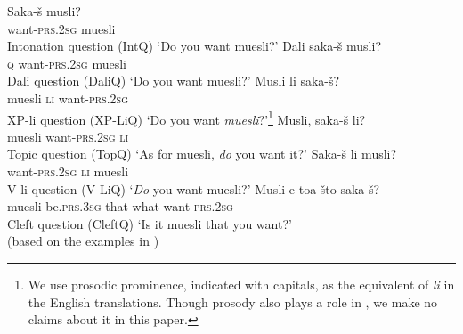 \documentclass[output=paper,
colorlinks,
citecolor=brown,
newtxmath
]{langscibook}
\begin{document}

\ea
    \ea \gll Saka-š musli? \\
want-\textsc{prs.2sg} muesli \\ \hfill Intonation question (IntQ)\label{intonation}
\glt  `Do you want muesli?' \label{intoq}
    \ex \gll Dali saka-š musli? \\
\textsc{q} want-\textsc{prs.2sg} muesli \\ \hfill Dali question (DaliQ)
\glt `Do you want muesli?'  \label{dali}
    \ex \gll Musli li saka-š? \\
muesli \textsc{li} want-\textsc{prs.2sg} \\ \hfill XP-li question (XP-LiQ)\label{li}
\glt `Do you want \emph{muesli}?'\footnote{We use prosodic prominence, indicated with capitals, as the equivalent of \textit{li} in the English translations. Though prosody also plays a role in , we make no claims about it in this paper.}
    \ex \gll Musli, saka-š li? \\
muesli want-\textsc{prs.2sg} \textsc{li} \\ \hfill Topic question (TopQ)
\glt `As for muesli, \emph{do} you want it?'\label{topli}
    \ex \gll Saka-š li musli? \\
want-\textsc{prs.2sg} \textsc{li} muesli \\ \hfill V-li question (V-LiQ)
\glt `\emph{Do} you want muesli?' \label{vli}
    \ex \gll Musli e toa što saka-š? \\
muesli be.\textsc{prs.3sg} that what want-\textsc{prs.2sg} \\ \hfill Cleft question (CleftQ)
\glt `Is it muesli that you want?'\\ \label{cleft} \hfill (based on the examples in \citealt[579]{Rudin.Kramer.Billings.Baerman1999})
\z\z \label{bigli}
\end{document}
